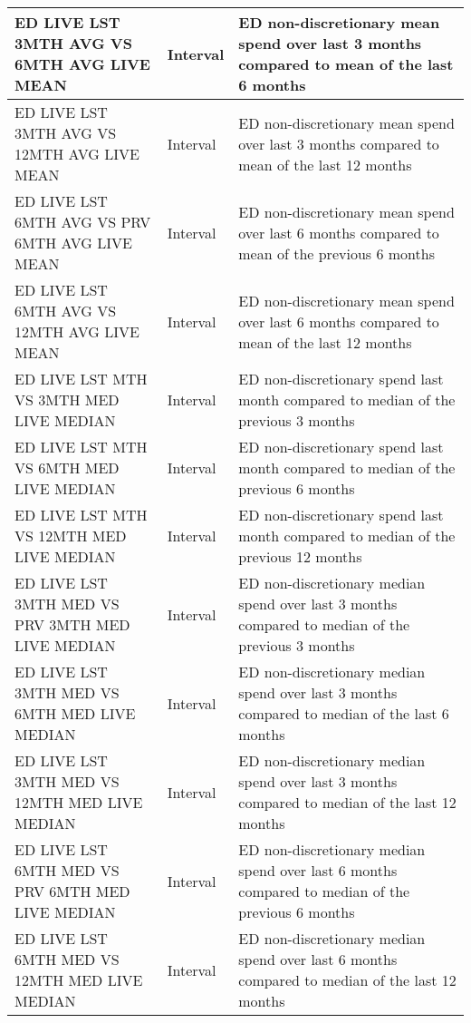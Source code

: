 \begin{longtable}{|p{5.5cm}|l|p{6.5cm}|}
	ED LIVE LST 3MTH AVG VS 6MTH AVG LIVE MEAN         & Interval           & ED non-discretionary mean spend over last 3 months compared to mean of the last 6 months         \\ \hline
	ED LIVE LST 3MTH AVG VS 12MTH AVG LIVE MEAN        & Interval           & ED non-discretionary mean spend over last 3 months compared to mean of the last 12 months        \\ \hline
	ED LIVE LST 6MTH AVG VS PRV 6MTH AVG LIVE MEAN    & Interval           & ED non-discretionary mean spend over last 6 months compared to mean of the previous 6 months     \\ \hline
	ED LIVE LST 6MTH AVG VS 12MTH AVG LIVE MEAN        & Interval           & ED non-discretionary mean spend over last 6 months compared to mean of the last 12 months        \\ \hline
	ED LIVE LST MTH VS 3MTH MED LIVE MEDIAN             & Interval           & ED non-discretionary spend last month compared to median of the previous 3 months                \\ \hline
	ED LIVE LST MTH VS 6MTH MED LIVE MEDIAN             & Interval           & ED non-discretionary spend last month compared to median of the previous 6 months                \\ \hline
	ED LIVE LST MTH VS 12MTH MED LIVE MEDIAN            & Interval           & ED non-discretionary spend last month compared to median of the previous 12 months               \\ \hline
	ED LIVE LST 3MTH MED VS PRV 3MTH MED LIVE MEDIAN  & Interval           & ED non-discretionary median spend over last 3 months compared to median of the previous 3 months \\ \hline
	ED LIVE LST 3MTH MED VS 6MTH MED LIVE MEDIAN       & Interval           & ED non-discretionary median spend over last 3 months compared to median of the last 6 months     \\ \hline
	ED LIVE LST 3MTH MED VS 12MTH MED LIVE MEDIAN      & Interval           & ED non-discretionary median spend over last 3 months compared to median of the last 12 months    \\ \hline
	ED LIVE LST 6MTH MED VS PRV 6MTH MED LIVE MEDIAN  & Interval           & ED non-discretionary median spend over last 6 months compared to median of the previous 6 months \\ \hline
	ED LIVE LST 6MTH MED VS 12MTH MED LIVE MEDIAN      & Interval           & ED non-discretionary median spend over last 6 months compared to median of the last 12 months    \\ \hline
\end{longtable}
